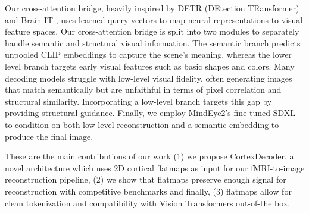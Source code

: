 Our cross-attention bridge, heavily inspired by DETR (DEtection TRansformer) \cite{DBLP:journals/corr/abs-2005-12872} and Brain-IT \cite{beliy2025brainitimagereconstructionfmri}, uses learned query vectors to map neural representations to visual feature spaces. Our cross-attention bridge is split into two modules to separately handle semantic and structural visual information. The semantic branch predicts unpooled CLIP \cite{radford2021learningtransferablevisualmodels} embeddings to capture the scene’s meaning, whereas the lower level branch targets early visual features such as basic shapes and colors. Many decoding models struggle with low-level visual fidelity, often generating images that match semantically but are unfaithful in terms of pixel correlation and structural similarity. Incorporating a low-level branch targets this gap by providing structural guidance. Finally, we employ MindEye2’s \cite{scotti2024mindeye2sharedsubjectmodelsenable} fine-tuned SDXL \cite{podell2023sdxlimprovinglatentdiffusion} to condition on both low-level reconstruction and a semantic embedding to produce the final image.

These are the main contributions of our work (1) we propose CortexDecoder, a novel architecture which uses 2D cortical flatmaps as input for our fMRI-to-image reconstruction pipeline, (2) we show that flatmaps preserve enough signal for reconstruction with competitive benchmarks and finally, (3) flatmaps allow for clean tokenization and compatibility with Vision Transformers out-of-the box.








